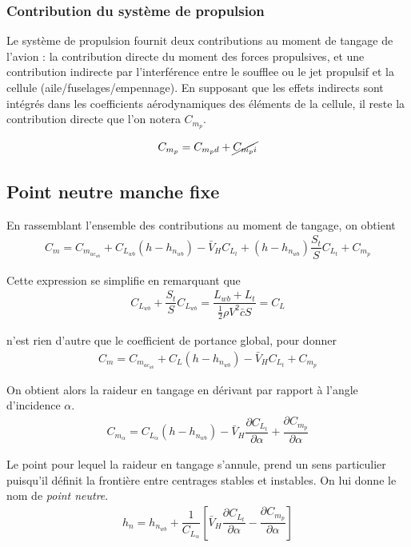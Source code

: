 \documentclass{report}
\begin{document}
\subsubsection{Contribution du système de propulsion}

Le système de propulsion fournit deux contributions au moment de tangage
de l’avion : la contribution directe du moment des forces propulsives, et une
contribution indirecte par l’interférence entre le soufflee ou le jet propulsif et la
cellule (aile/fuselages/empennage). En supposant que les effets indirects sont intégrés dans les coefficients aérodynamiques des éléments de la cellule, il reste la contribution directe que l'on notera $C_{m_p}$.

\begin{eqnarray}
C_{m_p}=C_{m_pd}+\cancel{C_{m_pi}}
\end{eqnarray}

\subsection{Point neutre manche fixe}

En rassemblant l'ensemble des contributions au moment de tangage, on obtient
\begin{eqnarray}
C_m=C_{m_{ac_{wb}}}+C_{L_{wb}}(h-h_{n_{wb}})-\bar{V}_HC_{L_t}+(h-h_{n_{wb}})\dfrac{S_t}{S}C_{L_t}+C_{m_p}
\end{eqnarray}

Cette expression se simplifie en remarquant que
\begin{eqnarray}
C_{L_{wb}}+\dfrac{S_t}{S}C_{L_{wb}}=\dfrac{L_{wb}+L_t}{\frac{1}{2}\rho V^2\bar{c}S}=C_L
\end{eqnarray}

n'est rien d'autre que le coefficient de portance global, pour donner
\begin{eqnarray}
C_m=C_{m_{ac_{wb}}}+C_L(h-h_{n_{wb}})-\bar{V}_HC_{L_t}+C_{m_p}
\end{eqnarray}

On obtient alors la raideur en tangage en dérivant par rapport à l'angle d'incidence $\alpha$.
\begin{eqnarray}
C_{m_\alpha}=C_{L_\alpha}(h-h_{n_{wb}})-\bar{V}_H\dfrac{\partial C_{L_t}}{\partial \alpha}+\dfrac{\partial C_{m_p}}{\partial \alpha}
\end{eqnarray}

Le point pour lequel la raideur en tangage s'annule, prend un sens particulier puisqu'il définit la frontière entre centrages stables et instables. On lui donne le nom de \textit{point neutre}.
\begin{eqnarray}
h_n = h_{n_{wb}}+\dfrac{1}{C_{L_\alpha}}\left[\bar{V}_H\dfrac{\partial C_{L_t}}{\partial\alpha}-\dfrac{\partial C_{m_p}}{\partial\alpha}\right]
\end{eqnarray}
\end{document}
